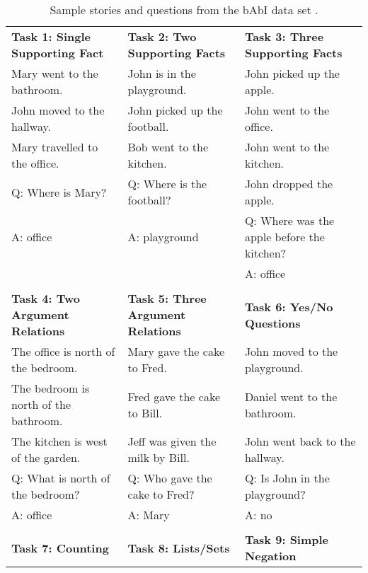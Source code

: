 \documentclass{article}
\begin{document}
\begin{table}
\caption{Sample stories and questions from the bAbI data set \cite{weston2015towards}.}
\centering
\scriptsize\sffamily\selectfont
\begin{tabular}{@{}lll@{}}
\textbf{Task 1: Single Supporting Fact}  &
\textbf{Task 2: Two Supporting Facts}    &
\textbf{Task 3: Three Supporting Facts}    \\
\cmidrule(r){1-1} \cmidrule(lr){2-2} \cmidrule(lr){3-3}
Mary went to the bathroom.            & John is in the playground.       & John picked up the apple.                  \\
John moved to the hallway.            & John picked up the football.     & John went to the office.                   \\
Mary travelled to the office.         & Bob went to the kitchen.         & John went to the kitchen.                  \\
Q: Where is Mary?                     & Q: Where is the football?        & John dropped the apple.                    \\
A: office                             & A: playground                    & Q: Where was the apple before the kitchen? \\
                                      &                                  & A: office                                  \\
&&\\
\textbf{Task 4: Two Argument Relations}  &
\textbf{Task 5: Three Argument Relations}    &
\textbf{Task 6: Yes/No Questions}    \\
\cmidrule(r){1-1} \cmidrule(lr){2-2} \cmidrule(lr){3-3}
The office is north of the bedroom.   & Mary gave the cake to Fred.      & John moved to the playground. \\
The bedroom is north of the bathroom. & Fred gave the cake to Bill.      & Daniel went to the bathroom.  \\
The kitchen is west of the garden.    & Jeff was given the milk by Bill. & John went back to the hallway.\\
Q: What is north of the bedroom?      & Q: Who gave the cake to Fred?    & Q: Is John in the playground? \\
A: office                             & A: Mary                          & A: no                         \\
&&\\
\textbf{Task 7: Counting}  &
\textbf{Task 8: Lists/Sets}    &
\textbf{Task 9: Simple Negation}    \\

\end{tabular}
\end{table}
\end{document}
